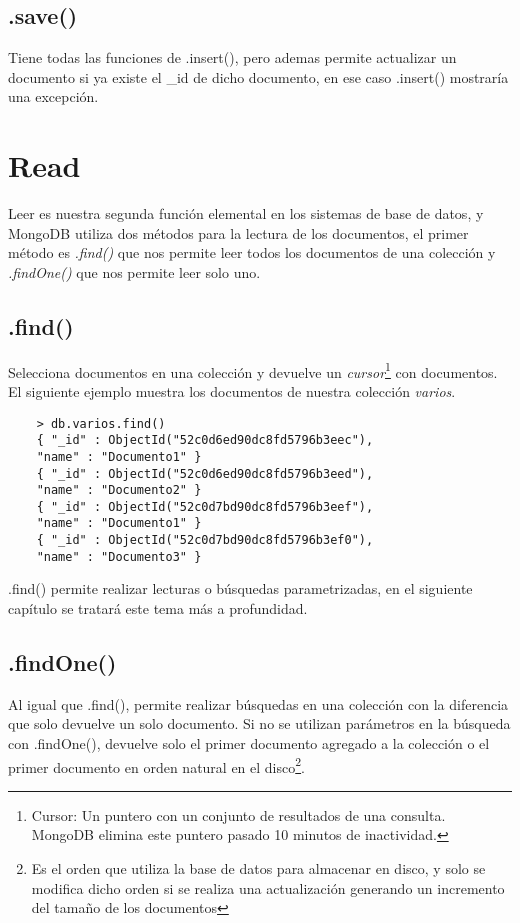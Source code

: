 \subsection{.save()}

Tiene todas las funciones de .insert(), pero ademas permite actualizar un documento si ya existe el \_id de dicho documento, en ese caso .insert() mostrar\'ia una excepci\'on.

\section{Read}

Leer es nuestra segunda funci\'on elemental en los sistemas de base de datos, y MongoDB utiliza dos m\'etodos para la lectura de los documentos, el primer m\'etodo es \textit{.find()} que nos permite leer todos los documentos de una colecci\'on y \textit{.findOne()} que nos permite leer solo uno.

\subsection{.find()}

Selecciona documentos en una colecci\'on y devuelve un \textit{cursor}\footnote{Cursor: Un puntero con un conjunto de resultados de una consulta. MongoDB elimina este puntero pasado 10 minutos de inactividad.} con documentos. El siguiente ejemplo muestra los documentos de nuestra colecci\'on \textit{varios}.

\begin{lstlisting}
    > db.varios.find()
    { "_id" : ObjectId("52c0d6ed90dc8fd5796b3eec"),
    "name" : "Documento1" }
    { "_id" : ObjectId("52c0d6ed90dc8fd5796b3eed"),
    "name" : "Documento2" }
    { "_id" : ObjectId("52c0d7bd90dc8fd5796b3eef"),
    "name" : "Documento1" }
    { "_id" : ObjectId("52c0d7bd90dc8fd5796b3ef0"),
    "name" : "Documento3" }
\end{lstlisting}

.find() permite realizar lecturas o b\'usquedas parametrizadas, en el siguiente cap\'itulo se tratar\'a este tema m\'as a profundidad.

\subsection{.findOne()}

Al igual que .find(), permite realizar b\'usquedas en una colecci\'on con la diferencia que solo devuelve un solo documento. Si no se utilizan par\'ametros en la b\'usqueda con .findOne(), devuelve solo el primer documento agregado a la colecci\'on o el primer documento en orden natural en el disco\footnote{Es el orden que utiliza la base de datos para almacenar en disco, y solo se modifica dicho orden si se realiza una actualizaci\'on generando un incremento del tama\~no de los documentos}.

